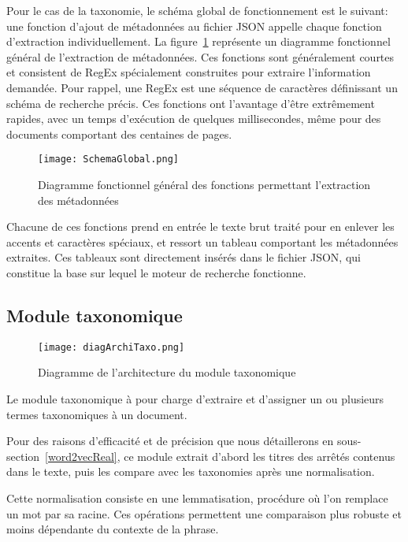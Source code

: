 Pour le cas de la taxonomie, le schéma global de fonctionnement est le suivant: une fonction d'ajout de métadonnées au fichier JSON appelle chaque fonction d'extraction individuellement.
La figure~\ref{fig:globalMeta} représente un diagramme fonctionnel général de l'extraction de métadonnées. 
Ces fonctions sont généralement courtes et consistent de RegEx spécialement construites pour extraire l'information demandée.
Pour rappel, une RegEx est une séquence de caractères définissant un schéma de recherche précis.
Ces fonctions ont l'avantage d'être extrêmement rapides, avec un temps d'exécution de quelques millisecondes, même pour des documents comportant des centaines de pages. 

\begin{figure}[h!]
  \centering
	\texttt{[image: SchemaGlobal.png]}
	\caption[]{Diagramme fonctionnel général des fonctions permettant l'extraction des métadonnées}
  \label{fig:globalMeta}
\end{figure}

Chacune de ces fonctions prend en entrée le texte brut traité pour en enlever les accents et caractères spéciaux, et ressort un tableau comportant les métadonnées extraites.
Ces tableaux sont directement insérés dans le fichier JSON, qui constitue la base sur lequel le moteur de recherche fonctionne.


\subsection{Module taxonomique}

\begin{figure}[h!]
  \centering
  \texttt{[image: diagArchiTaxo.png]}
	\caption[]{Diagramme de l'architecture du module taxonomique}
  \label{}
\end{figure}

Le module taxonomique à pour charge d'extraire et d'assigner un ou plusieurs termes taxonomiques à un document.

Pour des raisons d'efficacité et de précision que nous détaillerons en sous-section~\ref{word2vecReal}, ce module extrait d'abord les titres des arrêtés contenus dans le texte, puis les compare avec les taxonomies après une normalisation.

Cette normalisation consiste en une lemmatisation, procédure où l'on remplace un mot par sa racine.
Ces opérations permettent une comparaison plus robuste et moins dépendante du contexte de la phrase. 

